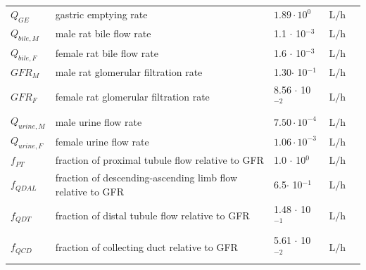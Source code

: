 \documentclass[preprint,12pt,authoryear]{elsarticle}
\begin{document}
\begin{longtable}{P{2cm}P{3.5cm}P{2cm}P{1cm}P{2.5cm}}
$Q_{GE}$ & gastric emptying rate & $1.89 \cdot 10^{0}$ & $\text{L}/\text{h}$ & \citep{yang_2013} \\

$Q_{bile,M}$ & male rat bile flow rate & 1.1 $\cdot$ 10$^{-3}$ & $\text{L}/\text{h}$ & \citep{prasnicka_2019} \\
$Q_{bile,F}$ & female rat bile flow rate & 1.6 $\cdot$ 10$^{-3}$ & $\text{L}/\text{h}$ & \citep{vonk_1978} \\
$GFR_{M}$ & male rat glomerular filtration rate & 1.30$\cdot$ 10$^{-1}$ & $\text{L}/\text{h}$ & \citep{corley_2005} \\
$GFR_{F}$ & female rat glomerular filtration rate & 8.56 $\cdot$ 10$^{-2}$ & $\text{L}/\text{h}$ & \citep{corley_2005} \\
$Q_{urine,M}$ & male urine flow rate  & $7.50 \cdot 10^{-4}$ & $\text{L}/\text{h}$ & \citep{schmidt_2001} \\
$Q_{urine,F}$ & female urine flow rate & $1.06 \cdot 10^{-3}$ & $\text{L}/\text{h}$ & \citep{schmidt_2001} \\

$f_{PT}$ &  fraction of proximal tubule flow relative to GFR & 1.0 $\cdot$ 10$^{0}$ & $\text{L}/\text{h}$ & \citep{gilmer_2018} \\
$f_{QDAL}$ &  fraction of descending-ascending limb flow relative to GFR & 6.5$\cdot$ 10$^{-1}$ & $\text{L}/\text{h}$ & \citep{gilmer_2018} \\
$f_{QDT}$ &  fraction of distal tubule flow relative to GFR  & 1.48 $\cdot$ 10$^{-1}$ & $\text{L}/\text{h}$ &\citep{gilmer_2018}  \\
$f_{QCD}$ &  fraction of collecting duct relative to GFR   & 5.61 $\cdot$ 10$^{-2}$ & $\text{L}/\text{h}$ & \citep{gilmer_2018} \\
\midrule\midrule


\end{longtable}
\end{document}
